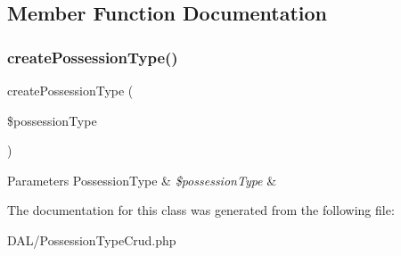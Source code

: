 \subsection{Member Function Documentation}
\mbox{\label{class_app_1_1_d_a_l_1_1_possession_type_crud_a76df75632aa1a562fe18429270ba0e5c}} 
\subsubsection{\texorpdfstring{createPossessionType()}{createPossessionType()}}
{\footnotesize\ttfamily create\+Possession\+Type (\begin{DoxyParamCaption}\item[{\mbox{\hyperlink{class_app_1_1_entity_1_1_possession_type}{Possession\+Type}}}]{\$possession\+Type }\end{DoxyParamCaption})}


\begin{DoxyParams}[1]{Parameters}
Possession\+Type & {\em \$possession\+Type} & \\
\hline
\end{DoxyParams}


The documentation for this class was generated from the following file\+:\begin{DoxyCompactItemize}
\item 
D\+A\+L/Possession\+Type\+Crud.\+php\end{DoxyCompactItemize}
